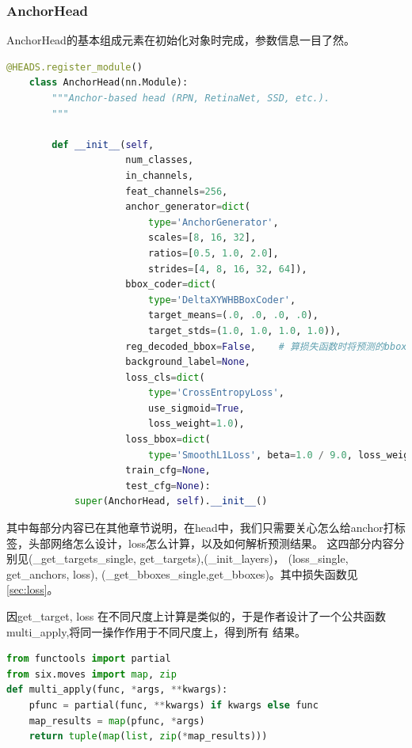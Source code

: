 \documentclass[UTF8]{ctexart}
\begin{document}
\subsubsection{AnchorHead}
\label{sub:anchorhead}
AnchorHead的基本组成元素在初始化对象时完成，参数信息一目了然。
\lstset{style=mystyle}
\begin{lstlisting}[language=Python]
    @HEADS.register_module()
    class AnchorHead(nn.Module):
        """Anchor-based head (RPN, RetinaNet, SSD, etc.).
        """  
    
        def __init__(self,
                     num_classes,
                     in_channels,
                     feat_channels=256,
                     anchor_generator=dict(
                         type='AnchorGenerator',
                         scales=[8, 16, 32],
                         ratios=[0.5, 1.0, 2.0],
                         strides=[4, 8, 16, 32, 64]),
                     bbox_coder=dict(
                         type='DeltaXYWHBBoxCoder',
                         target_means=(.0, .0, .0, .0),
                         target_stds=(1.0, 1.0, 1.0, 1.0)),
                     reg_decoded_bbox=False,    # 算损失函数时将预测的bbox解码(若True,一般效果不会好吧)
                     background_label=None,
                     loss_cls=dict(
                         type='CrossEntropyLoss',
                         use_sigmoid=True,
                         loss_weight=1.0),
                     loss_bbox=dict(
                         type='SmoothL1Loss', beta=1.0 / 9.0, loss_weight=1.0),
                     train_cfg=None,
                     test_cfg=None):
            super(AnchorHead, self).__init__()

\end{lstlisting}
其中每部分内容已在其他章节说明，在head中，我们只需要关心怎么给anchor打标签，头部网络怎么设计，loss怎么计算，以及如何解析预测结果。
这四部分内容分别见(\_get\_targets\_single, get\_targets),(\_init\_layers)， (loss\_single, get\_anchors, loss),
(\_get\_bboxes\_single,get\_bboxes)。其中损失函数见\ref{sec:loss}。

因get\_target, loss 在不同尺度上计算是类似的，于是作者设计了一个公共函数multi\_apply,将同一操作作用于不同尺度上，得到所有
结果。

\lstset{style=mystyle}
\begin{lstlisting}[language=Python]
from functools import partial
from six.moves import map, zip
def multi_apply(func, *args, **kwargs):
    pfunc = partial(func, **kwargs) if kwargs else func
    map_results = map(pfunc, *args)
	return tuple(map(list, zip(*map_results)))
\end{lstlisting}
\end{document}
